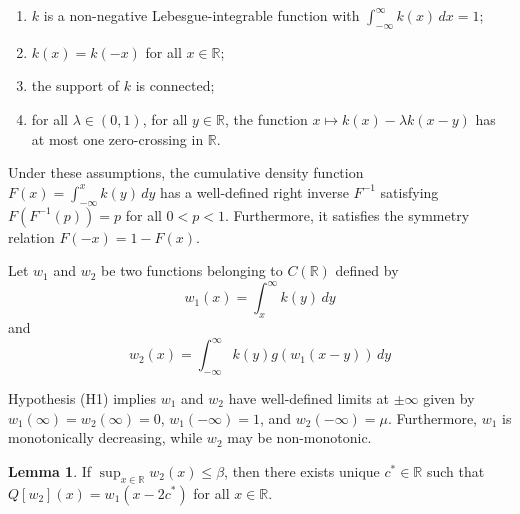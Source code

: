 \documentclass[11pt]{article}
\theoremstyle{definition}
\newtheorem{lem}[thm]{Lemma}
\numberwithin{equation}{section}
\numberwithin{thm}{section}
\renewcommand{\b}{\beta}
\newcommand{\m}{\mu}
\begin{document}
\begin{enumerate}[(H1)]
\item $k$ is a non-negative Lebesgue-integrable function with $\int_{-\infty}^{\infty} k(x) \, dx = 1$;

\item $k(x)=k(-x)$ for all $x\in\mathbb R$;

\item the support of $k$ is connected;

\item  for all $\lambda\in(0,1)$, for all $y\in\mathbb R$, the function $x \mapsto k(x)-\lambda k(x-y)$ has at most one zero-crossing in $\mathbb R$.
\end{enumerate}

Under these assumptions, the cumulative density function $F(x)=\int_{-\infty}^{x}k(y)\,dy$ has a well-defined right inverse $F^{-1}$ satisfying $F(F^{-1}(p))=p$ for all $0<p<1$. Furthermore, it satisfies the symmetry relation $F(-x)=1-F(x)$.

 Let $w_1$ and $w_2$ be two functions belonging to $C(\mathbb R)$ defined by
\begin{equation} \label{w1}
w_1(x) = \int_x^\infty k(y) \, dy
\end{equation}
and
\begin{equation} \label{w2}
w_2(x) = \int_{-\infty}^{\infty} k(y) g(w_1(x-y)) \, dy 
\end{equation}

Hypothesis (H1) implies $w_1$ and $w_2$ have well-defined limits at $\pm\infty$ given by $w_1(\infty)=w_2(\infty)=0$, $w_1(-\infty)=1$, and $w_2(-\infty)=\m$. Furthermore, $w_1$ is monotonically decreasing, while $w_2$ may be non-monotonic.

\begin{lem} \label{lemma1}
If $\sup_{x\in\mathbb R}w_2(x)\leq \b$, then there exists unique $c^*\in\mathbb R$ such that $Q[w_2](x)=w_1(x-2c^*)$ for all $x\in\mathbb R$.
\end{lem}
\end{document}
